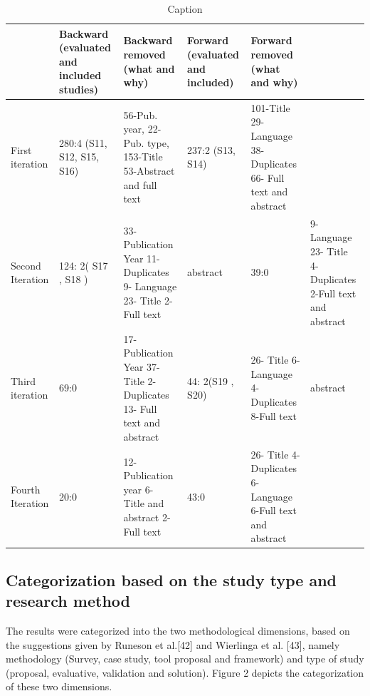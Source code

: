 \documentclass{article}
\begin{document}
\begin{table}[]
    
    \hline
    \begin{tabular}{|p{1.5cm}|p{2.5cm}|p{2.5cm}|p{2cm}|p{2cm}|}
   
         &  Backward (evaluated and included studies) & Backward removed (what and why) & Forward (evaluated and included) & Forward removed (what and why) \\
          \hline
       First iteration  &  280:4 \newline (S11\cite{metsa2007testing}, S12\cite{bjarnason2015industrial}, S15\cite{ferguson2006empirical}, S16\cite{bjarnason2014alignment}) & 56-Pub. year, 22-Pub. type, 153-Title
53-Abstract and full text & 237:2 \newline (S13\cite{aichernig2014integration}, S14\cite{bjarnason2015industrial}) & 101-Title 29-Language 38- Duplicates 66- Full text and abstract \\
\hline
Second Iteration & 124: 2( S17 \cite{melnik2006executable}, S18 \cite{bjarnason2013distances}) & 33- Publication Year 11- Duplicates 9- Language 23- Title 2-Full text & abstract & 39:0 & 9- Language 23- Title 4- Duplicates 2-Full text and abstract \\
Third iteration & 69:0 & 17- Publication Year 37- Title 2- Duplicates 13- Full text and abstract & 44: 2(S19 \cite{melnik2004suitability}, S20) & 26- Title 6- Language 4- Duplicates 8-Full text & abstract \\
Fourth Iteration & 20:0 & 12- Publication year 6- Title and abstract 2- Full text & 43:0 & 26- Title 4- Duplicates 6- Language 6-Full text and abstract \\
\hline
    \end{tabular}
    \caption{Caption}
    \label{tab:my_label}
\end{table}

\subsection{Categorization based on the study type and research method}\label{ResultsCat}

The results were categorized into the two methodological dimensions, based on the suggestions given by Runeson et al.[42] and Wierlinga et al. [43], namely methodology (Survey, case study, tool proposal and framework) and type of study (proposal, evaluative, validation and solution). Figure 2 depicts the categorization of these two dimensions. 
\end{document}
